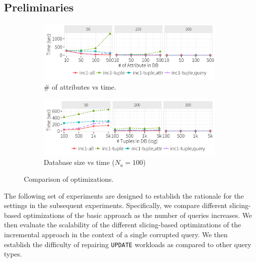 \subsection{Preliminaries}

 \begin{figure}[ht]
    \vspace*{-.1in}
    \centering
    \begin{subfigure}[t]{.49\textwidth}
    \includegraphics[width = .99\columnwidth]{figures/attr_time}
    \vspace*{-.1in}
    \caption{\# of attributes vs time.}
    \label{f:attr} 
    \end{subfigure}
    \begin{subfigure}[t]{.49\textwidth}
    \includegraphics[width = .99\columnwidth]{figures/attr100_time}
    \vspace*{-.1in}
    \caption{Database size vs time ($N_a = 100$)}
    \label{f:attr100} 
    \end{subfigure}
    \vspace*{-.15in}
    \caption{Comparison of optimizations.}
    \vspace*{-.15in}
  \end{figure}
The following set of experiments are designed to establish the rationale for 
the settings in the subsequent experiments.  
Specifically, we compare different slicing-based optimizations of the basic approach
as the number of queries increases.  
We then evaluate the scalability of the different slicing-based optimizations of the 
incremental approach in the context of a single
corrupted query. We then establish the difficulty of repairing \texttt{UPDATE} 
workloads as compared to other query types. 

